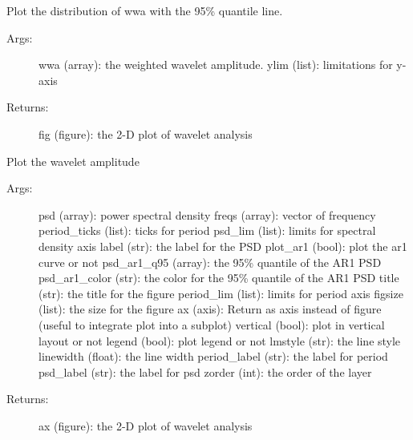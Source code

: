 \documentclass[letterpaper,10pt,english]{sphinxmanual}
\begin{document}
\begin{fulllineitems}
\label{\detokenize{Spectral:pyleoclim.Spectral.plot_wwadist}}
Plot the distribution of wwa with the 95\% quantile line.
\begin{description}
\item[{Args:}] \leavevmode
wwa (array): the weighted wavelet amplitude.
ylim (list): limitations for y-axis

\item[{Returns:}] \leavevmode
fig (figure): the 2-D plot of wavelet analysis

\end{description}

\end{fulllineitems}


\begin{fulllineitems}
\label{\detokenize{Spectral:pyleoclim.Spectral.plot_psd}}
Plot the wavelet amplitude
\begin{description}
\item[{Args:}] \leavevmode
psd (array): power spectral density
freqs (array): vector of frequency
period\_ticks (list): ticks for period
psd\_lim (list): limits for spectral density axis
label (str): the label for the PSD
plot\_ar1 (bool): plot the ar1 curve or not
psd\_ar1\_q95 (array): the 95\% quantile of the AR1 PSD
psd\_ar1\_color (str): the color for the 95\% quantile of the AR1 PSD
title (str): the title for the figure
period\_lim (list): limits for period axis
figsize (list): the size for the figure
ax (axis): Return as axis instead of figure (useful to integrate plot into a subplot)
vertical (bool): plot in vertical layout or not
legend (bool): plot legend or not
lmstyle (str): the line style
linewidth (float): the line width
period\_label (str): the label for period
psd\_label (str): the label for psd
zorder (int): the order of the layer

\item[{Returns:}] \leavevmode
ax (figure): the 2-D plot of wavelet analysis

\end{description}

\end{fulllineitems}
\end{document}
